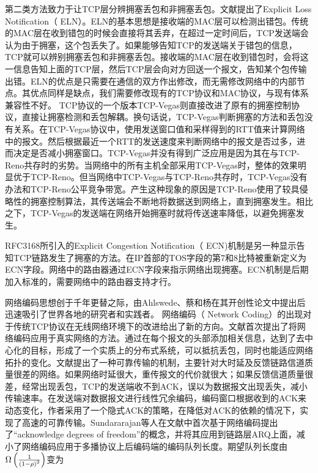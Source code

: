\par
第二类方法致力于让TCP层分辨拥塞丢包和非拥塞丢包。文献\cite{buchholcz2003explicit}提出了Explicit Loss Notification（ ELN）。ELN的基本思想是接收端的MAC层可以检测出错包。传统的MAC层在收到错包的时候会直接将其丢弃，在超过一定时间后，TCP发送端会认为由于拥塞，这个包丢失了。如果能够告知TCP的发送端关于错包的信息，TCP就可以辨别拥塞丢包和非拥塞丢包。接收端的MAC层在收到错包时，会将这一信息告知上面的TCP层，然后TCP层会向对方回送一个报文，告知某个包传输出错。ELN的优点是只需要在通信的双方作出修改，而无需修改网络中的内部节点。其优点同样是缺点，我们需要修改现有的TCP协议和MAC协议，与现有体系兼容性不好。
TCP协议的一个版本TCP-Vegas\textsuperscript{\cite{brakmo1995tcp}}则直接改进了原有的拥塞控制协议，直接让拥塞检测和丢包解耦。换句话说，TCP-Vegas判断拥塞的方法和丢包没有关系。在TCP-Vegas协议中，使用发送窗口值和采样得到的RTT值来计算网络中的报文。然后根据最近一个RTT的发送速度来判断网络中的报文是否过多，进而决定是否减小拥塞窗口。TCP-Vegas并没有得到广泛应用是因为其在与TCP-Reno共存时的劣势。当网络中的所有主机全部采用TCP-Vegas时，整体的效果明显优于TCP-Reno。但当网络中TCP-Vegas与TCP-Reno共存时，TCP-Vegas没有办法和TCP-Reno公平竞争带宽。产生这种现象的原因是TCP-Reno使用了较具侵略性的拥塞控制算法，其传送端会不断地将数据送到网络上，直到拥塞发生。相比之下，TCP-Vegas的发送端在网络开始拥塞时就将传送速率降低，以避免拥塞发生。
\par
RFC3168所引入的Explicit Congestion Notification（ ECN)机制\textsuperscript{\cite{ramakrishnan2001rfc}}是另一种显示告知TCP链路发生了拥塞的方法。在IP首部的TOS字段的第7和8比特被重新定义为ECN字段。网络中的路由器通过ECN字段来指示网络出现拥塞。ECN机制是后期加入标准的，需要网络中的路由器支持才行。
\par
网络编码思想创于千年更替之际，由Ahlswede、蔡和杨在其开创性论文\cite{Ahlswede2000}中提出后迅速吸引了世界各地的研究者和实践者。
网络编码（ Network Coding）的出现对于传统TCP协议在无线网络环境下的改进给出了新的方向。文献\cite{chou2003practical}首次提出了将网络编码应用于真实网络的方法。通过在每个报文的头部添加相关信息，达到了去中心化的目标，形成了一个实质上的分布式系统，可以抵抗丢包，同时也能适应网络拓扑的变化。文献\cite{ontheflycoding}提出了一种可靠传输的机制，主要针对大时延及反馈链路信道质量很差的网络。如果网络时延很大，重传报文的代价就很大；如果反馈信道质量很差，经常出现丢包，TCP的发送端收不到ACK，误以为数据报文出现丢失，减小传输速率。在发送端对数据报文进行线性冗余编码，编码窗口根据收到的ACK来动态变化，作者采用了一个隐式ACK的策略，在降低对ACK的依赖的情况下，实现了高速的可靠传输。Sundararajan等人在文献\cite{4595268}中首次基于网络编码提出了“acknowledge degrees of freedom”的概念，并将其应用到链路层ARQ上面，减小了网络编码应用于多播协议上后编码端的编码队列长度。期望队列长度由$\Omega \left( {\frac{1}{{{{\left( {1{\rm{ - }}\rho } \right)}^2}}}} \right)$变为
